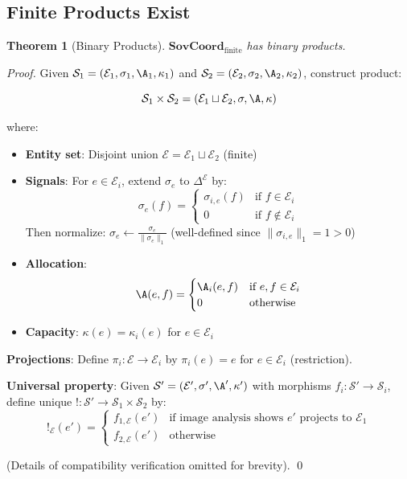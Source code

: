 \documentclass[11pt,a4paper]{article}
\newtheorem{theorem}{Theorem}[section]
\theoremstyle{definition}
\theoremstyle{remark}
\newcommand{\E}{\mathcal{E}}
\newcommand{\SovCoord}{\mathbf{SovCoord}}
\begin{document}
\subsection{Finite Products Exist}

\begin{theorem}[Binary Products]
\label{thm:products}
$\SovCoord_{\text{finite}}$ has binary products.
\end{theorem}

\begin{proof}
Given $\mathcal{S}_1 = (\E_1, \sigma_1, \A_1, \kappa_1)$ and $\mathcal{S}_2 = (\E_2, \sigma_2, \A_2, \kappa_2)$, construct product:

\[ \mathcal{S}_1 \times \mathcal{S}_2 = (\E_1 \sqcup \E_2, \sigma, \A, \kappa) \]

where:
\begin{itemize}
\item \textbf{Entity set}: Disjoint union $\E = \E_1 \sqcup \E_2$ (finite)
\item \textbf{Signals}: For $e \in \E_i$, extend $\sigma_e$ to $\Delta^{\E}$ by:
  \[ \sigma_e(f) = \begin{cases}
    \sigma_{i,e}(f) & \text{if } f \in \E_i \\
    0 & \text{if } f \notin \E_i
  \end{cases} \]
  Then normalize: $\sigma_e \leftarrow \frac{\sigma_e}{\|\sigma_e\|_1}$ (well-defined since $\|\sigma_{i,e}\|_1 = 1 > 0$)
\item \textbf{Allocation}: 
  \[ \A(e,f) = \begin{cases}
    \A_i(e,f) & \text{if } e,f \in \E_i \\
    0 & \text{otherwise}
  \end{cases} \]
\item \textbf{Capacity}: $\kappa(e) = \kappa_i(e)$ for $e \in \E_i$
\end{itemize}

\textbf{Projections}: Define $\pi_i: \E \to \E_i$ by $\pi_i(e) = e$ for $e \in \E_i$ (restriction).

\textbf{Universal property}: Given $\mathcal{S}' = (\E', \sigma', \A', \kappa')$ with morphisms $f_i: \mathcal{S}' \to \mathcal{S}_i$, define unique $!: \mathcal{S}' \to \mathcal{S}_1 \times \mathcal{S}_2$ by:
\[ !_\E(e') = \begin{cases}
  f_{1,\E}(e') & \text{if image analysis shows } e' \text{ projects to } \E_1 \\
  f_{2,\E}(e') & \text{otherwise}
\end{cases} \]

(Details of compatibility verification omitted for brevity). \qed
\end{proof}
\end{document}
